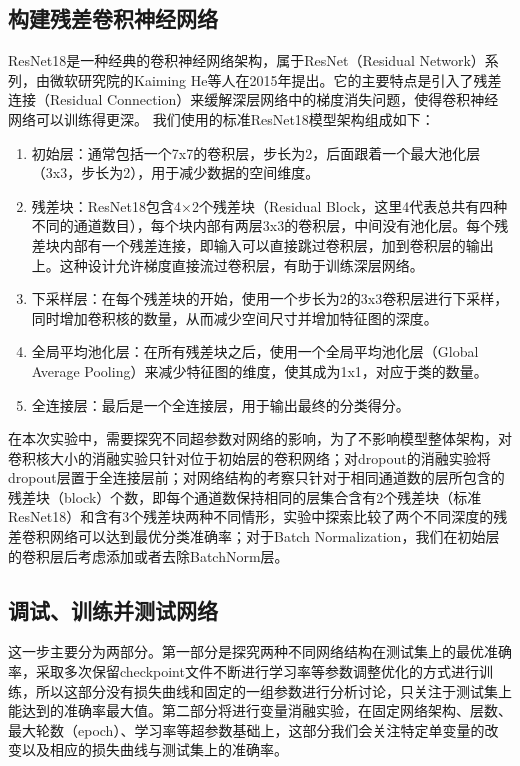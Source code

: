 \documentclass{article}
\begin{document}
	\subsection{构建残差卷积神经网络}
	ResNet18是一种经典的卷积神经网络架构，属于ResNet（Residual Network）系列，由微软研究院的Kaiming He等人在2015年提出。它的主要特点是引入了残差连接（Residual Connection）来缓解深层网络中的梯度消失问题，使得卷积神经网络可以训练得更深。
	我们使用的标准ResNet18模型架构组成如下：
	\begin{enumerate}[label=\textbullet]
	\item 初始层：通常包括一个7x7的卷积层，步长为2，后面跟着一个最大池化层（3x3，步长为2），用于减少数据的空间维度。
	\item 残差块：ResNet18包含4×2个残差块（Residual Block，这里4代表总共有四种不同的通道数目），每个块内部有两层3x3的卷积层，中间没有池化层。每个残差块内部有一个残差连接，即输入可以直接跳过卷积层，加到卷积层的输出上。这种设计允许梯度直接流过卷积层，有助于训练深层网络。
	\item 下采样层：在每个残差块的开始，使用一个步长为2的3x3卷积层进行下采样，同时增加卷积核的数量，从而减少空间尺寸并增加特征图的深度。
	\item 全局平均池化层：在所有残差块之后，使用一个全局平均池化层（Global Average Pooling）来减少特征图的维度，使其成为1x1，对应于类的数量。
	\item 全连接层：最后是一个全连接层，用于输出最终的分类得分。
	\end{enumerate}
	在本次实验中，需要探究不同超参数对网络的影响，为了不影响模型整体架构，对卷积核大小的消融实验只针对位于初始层的卷积网络；对dropout的消融实验将dropout层置于全连接层前；对网络结构的考察只针对于相同通道数的层所包含的残差块（block）个数，即每个通道数保持相同的层集合含有2个残差块（标准ResNet18）和含有3个残差块两种不同情形，实验中探索比较了两个不同深度的残差卷积网络可以达到最优分类准确率；对于Batch Normalization，我们在初始层的卷积层后考虑添加或者去除BatchNorm层。
	
	
	\subsection{调试、训练并测试网络}
	这一步主要分为两部分。第一部分是探究两种不同网络结构在测试集上的最优准确率，采取多次保留checkpoint文件不断进行学习率等参数调整优化的方式进行训练，所以这部分没有损失曲线和固定的一组参数进行分析讨论，只关注于测试集上能达到的准确率最大值。第二部分将进行变量消融实验，在固定网络架构、层数、最大轮数（epoch）、学习率等超参数基础上，这部分我们会关注特定单变量的改变以及相应的损失曲线与测试集上的准确率。\\
	\setcounter{section}{3}
\end{document}
